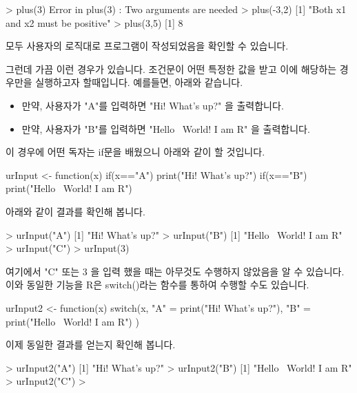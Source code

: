 \begin{Schunk}
\begin{Soutput}
> plus(3)
Error in plus(3) : Two arguments are needed
> plus(-3,2)
[1] "Both x1 and x2 must be positive"
> plus(3,5)
[1] 8
\end{Soutput}
\end{Schunk}

모두 사용자의 로직대로 프로그램이 작성되었음을 확인할 수 있습니다. 


그런데 가끔 이런 경우가 있습니다. 
조건문이 어떤 특정한 값을 받고 이에 해당하는 경우만을 실행하고자 할때입니다. 
예를들면, 아래와 같습니다.

\begin{itemize}
\item 만약, 사용자가 "A"를 입력하면 "Hi! What's up?" 을 출력합니다.
\item 만약, 사용자가 "B"를 입력하면 "Hello~ World! I am R" 을 출력합니다.
\end{itemize}

이 경우에 어떤 독자는 if문을 배웠으니 아래와 같이 할 것입니다.

\begin{Schunk}
\begin{Soutput}
urInput <- function(x){
	if(x=="A") print("Hi! What's up?")
	if(x=="B") print("Hello~ World! I am R")
}
\end{Soutput}
\end{Schunk}

아래와 같이 결과를 확인해 봅니다. 
\begin{Schunk}
\begin{Soutput}
> urInput("A")
[1] "Hi! What's up?"
> urInput("B")
[1] "Hello~ World! I am R"
> urInput("C")
> urInput(3)
\end{Soutput}
\end{Schunk}

여기에서 "C" 또는 3 을 입력 했을 때는 아무것도 수행하지 않았음을 알 수 있습니다. 
이와 동일한 기능을 R은 switch()라는 함수를 통하여 수행할 수도 있습니다. 

\begin{Schunk}
\begin{Soutput}
urInput2 <- function(x){
	switch(x, 
		"A" = print("Hi! What's up?"),
		"B" = print("Hello~ World! I am R")
	)
}
\end{Soutput}
\end{Schunk}

이제 동일한 결과를 얻는지 확인해 봅니다. 

\begin{Schunk}
\begin{Soutput}
> urInput2("A")
[1] "Hi! What's up?"
> urInput2("B")
[1] "Hello~ World! I am R"
> urInput2("C")
>
\end{Soutput}
\end{Schunk}

